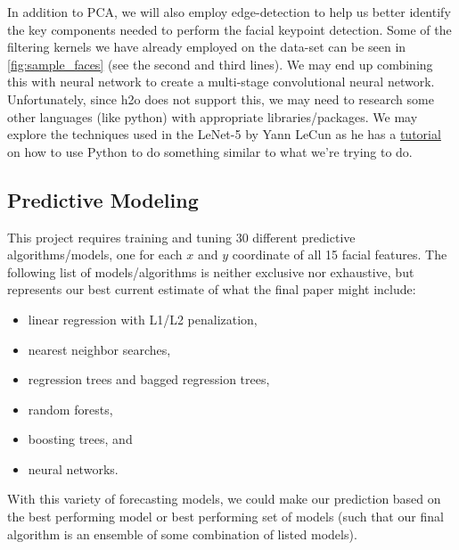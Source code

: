 \documentclass[conference]{IEEEtran}
\begin{document}
In addition to PCA, we will also employ edge-detection to help us better identify the key components needed to perform the facial keypoint detection.  Some of the filtering kernels we have already employed on the data-set can be seen in \cref{fig:sample_faces} (see the second and third lines).  We may end up combining this with neural network to create a multi-stage convolutional neural network.  Unfortunately, since h2o does not support this, we may need to research some other languages (like python) with appropriate libraries/packages.  We may explore the techniques used in the LeNet-5 by Yann LeCun as he has a \href{http://deeplearning.net/tutorial/lenet.html}{tutorial} on how to use Python to do something similar to what we're trying to do.

\subsection{Predictive Modeling}
This project requires training and tuning 30 different predictive algorithms/models, one for each $x$ and $y$ coordinate of all 15 facial features. The following list of models/algorithms is neither exclusive nor exhaustive, but represents our best current estimate of what the final paper might include:
\begin{itemize}
    \item linear regression with L1/L2 penalization,
    \item nearest neighbor searches,
    \item regression trees and bagged regression trees,
    \item random forests,
    \item boosting trees, and
    \item neural networks.
\end{itemize}
With this variety of forecasting models, we could make our prediction based on the best performing model or best performing set of models (such that our final algorithm is an ensemble of some combination of listed models).
\end{document}
